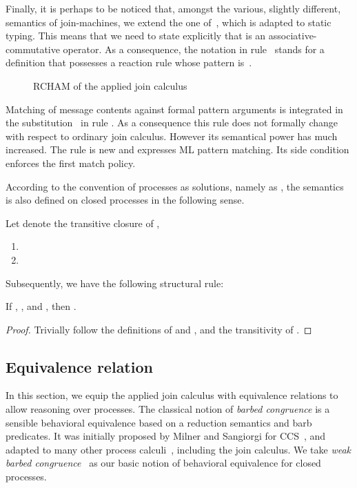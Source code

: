 \documentclass{LMCS}
\newcommand{\forget}[1]{}
\newcommand{\rln}[1]{\text{\small\sc #1}}
\renewcommand{\_}{\mathord{\rule[-.25ex]{1ex}{.15ex}}}
\begin{document}
Finally, it is perhaps to be noticed that, amongst the various,
slightly different, semantics of join-machines, we extend the one
of~\cite{Fournet-Laneve-Maranget-Remy:typing-join}, which is adapted
to static typing.  This means that we need to state explicitly that
 is an associative-commutative operator.  As a consequence,
the notation  in rule~\rln{React} stands for
a definition that possesses a reaction rule whose pattern is~.
\begin{figure}
\centering

\caption{RCHAM of the applied join calculus}\label{fig.cham}
\end{figure}

Matching of message contents against formal pattern arguments
is integrated in the substitution~ in rule \rln{React}.
As a consequence  this rule does not formally change
with respect to ordinary join calculus. However its semantical power has
much increased.
The \rln{Match} rule is new and expresses ML pattern matching.  
Its side condition enforces the first match policy.

According to the convention of processes as solutions, namely  as
, the semantics is also defined on closed processes
in the following sense.
\begin{defi}
  Let  denote the transitive closure of
  , 
  \begin{enumerate}[(1)]
  \item 
  \item 
  \end{enumerate}
\end{defi}
Subsequently, we have the following structural rule:
\begin{lem}\label{struct-rule}
  If , , and , then .
\end{lem}
\begin{proof}
  Trivially follow the definitions of  and , and the
  transitivity of . \forget{\qed}
\end{proof}
\subsection{Equivalence relation}
\label{subsec.eq}

In this section, we equip the applied join calculus with equivalence
relations to allow reasoning over processes. The classical
notion of \emph{barbed congruence} is a sensible behavioral
equivalence based on a reduction semantics and barb predicates. It was
initially proposed by Milner and Sangiorgi for
CCS~\cite{Milner92barbed}, and adapted to many other process
calculi~\cite{Honda95reductionbased,Amadio96bisimulations}, including
the join calculus. We take \emph{weak
  barbed congruence}~\cite{Milner92barbed} as our basic notion of
behavioral equivalence for closed processes.
\end{document}
